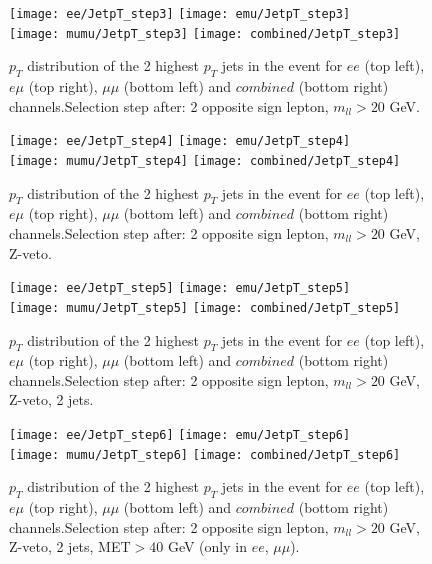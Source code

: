 \documentclass[12pt, a4paper, titlepage]{article}
\begin{document}
\clearpage
\newpage

\begin{figure}
  \texttt{[image: ee/JetpT\_step3]}
  \texttt{[image: emu/JetpT\_step3]}\\
  \texttt{[image: mumu/JetpT\_step3]}
  \texttt{[image: combined/JetpT\_step3]}
\caption{$p_T$ distribution of the 2 highest $p_T$ jets in the event for $ee$ (top left), $e\mu$ (top right), $\mu\mu$ (bottom left) and $combined$ (bottom right) channels.\newline Selection step after: 2 opposite sign lepton, $m_{ll}>20$ GeV.}
\end{figure}

\clearpage
\newpage


\begin{figure}
  \texttt{[image: ee/JetpT\_step4]}
  \texttt{[image: emu/JetpT\_step4]}\\
  \texttt{[image: mumu/JetpT\_step4]}
  \texttt{[image: combined/JetpT\_step4]}
\caption{$p_T$ distribution of the 2 highest $p_T$ jets in the event for $ee$ (top left), $e\mu$ (top right), $\mu\mu$ (bottom left) and $combined$ (bottom right) channels.\newline Selection step after: 2 opposite sign lepton, $m_{ll}>20$ GeV, Z-veto.}
\end{figure}

\clearpage
\newpage


\begin{figure}
  \texttt{[image: ee/JetpT\_step5]}
  \texttt{[image: emu/JetpT\_step5]}\\
  \texttt{[image: mumu/JetpT\_step5]}
  \texttt{[image: combined/JetpT\_step5]}
\caption{$p_T$ distribution of the 2 highest $p_T$ jets in the event for $ee$ (top left), $e\mu$ (top right), $\mu\mu$ (bottom left) and $combined$ (bottom right) channels.\newline Selection step after: 2 opposite sign lepton, $m_{ll}>20$ GeV, Z-veto, 2 jets.}
\end{figure}

\clearpage
\newpage


\begin{figure}
  \texttt{[image: ee/JetpT\_step6]}
  \texttt{[image: emu/JetpT\_step6]}\\
  \texttt{[image: mumu/JetpT\_step6]}
  \texttt{[image: combined/JetpT\_step6]}
\caption{$p_T$ distribution of the 2 highest $p_T$ jets in the event for $ee$ (top left), $e\mu$ (top right), $\mu\mu$ (bottom left) and $combined$ (bottom right) channels.\newline Selection step after: 2 opposite sign lepton, $m_{ll}>20$ GeV, Z-veto, 2 jets, MET$>40$ GeV (only in $ee$, $\mu\mu$).}
\end{figure}
\end{document}
